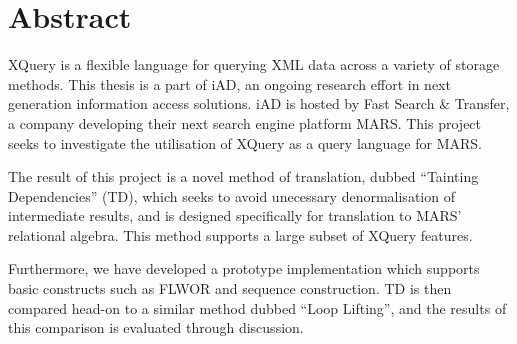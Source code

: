 \chapter*{Abstract}
XQuery is a flexible language for querying XML data across a variety of storage
methods. This thesis is a part of iAD, an ongoing research effort in
next generation information access solutions. iAD is hosted by Fast Search \&
Transfer, a company developing their next search engine platform
MARS. This project seeks to investigate the utilisation of XQuery as a query
language for MARS.

The result of this project is a novel method of translation, dubbed ``Tainting
Dependencies'' (TD), which seeks to avoid unecessary
denormalisation of intermediate results, and is designed specifically
for translation to MARS' relational algebra. This method supports a large subset of XQuery features.

Furthermore, we have developed a prototype implementation which supports basic
constructs such as FLWOR and sequence construction. TD is
then compared head-on to a similar method dubbed ``Loop Lifting'', and the
results of this comparison is evaluated through discussion.

% 
